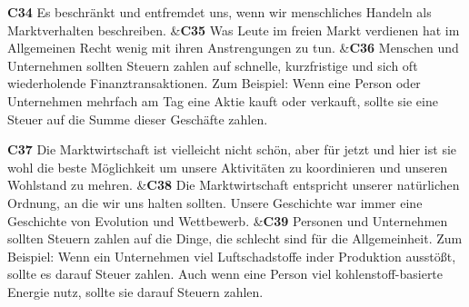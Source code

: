 \documentclass[
		11pt,
		a4paper,
		openright,
		oneside,
		ngerman
	]
	{book}
\begin{document}
\begin{longtabu}[htpb]
\textbf{C34} %
		Es beschränkt und entfremdet uns, wenn wir menschliches Handeln als Marktverhalten beschreiben.
&\textbf{C35} %
		Was Leute im freien Markt verdienen hat im Allgemeinen Recht wenig mit ihren Anstrengungen zu tun.
&\textbf{C36} %
		Menschen und Unternehmen sollten Steuern zahlen auf schnelle, kurzfristige und sich oft wiederholende Finanztransaktionen.
		Zum Beispiel: Wenn eine Person oder Unternehmen mehrfach am Tag eine Aktie kauft oder verkauft, sollte sie eine Steuer auf die Summe dieser Geschäfte zahlen.
\\

\midrule

\textbf{C37} %
		Die Marktwirtschaft ist vielleicht nicht schön, aber für jetzt und hier ist sie wohl die beste Möglichkeit um unsere Aktivitäten zu koordinieren und unseren Wohlstand zu mehren.
&\textbf{C38}
		Die Marktwirtschaft entspricht unserer natürlichen Ordnung, an die wir uns halten sollten.
		Unsere Geschichte war immer eine Geschichte von Evolution und Wettbewerb.
&\textbf{C39} %
		Personen und Unternehmen sollten Steuern zahlen auf die Dinge, die schlecht sind für die Allgemeinheit.
		Zum Beispiel: Wenn ein Unternehmen viel Luftschadstoffe inder Produktion ausstößt, sollte es darauf Steuer zahlen.
		Auch wenn eine Person viel kohlenstoff-basierte Energie nutz, sollte sie darauf Steuern zahlen.
\\

\midrule


\end{longtabu}
\end{document}
